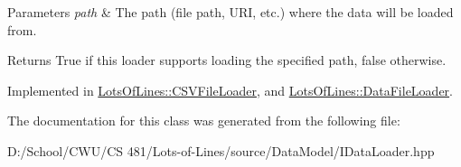 \begin{DoxyParams}{Parameters}
{\em path} & The path (file path, U\+RI, etc.) where the data will be loaded from. \\
\hline
\end{DoxyParams}
\begin{DoxyReturn}{Returns}
True if this loader supports loading the specified path, false otherwise. 
\end{DoxyReturn}


Implemented in \hyperlink{class_lots_of_lines_1_1_c_s_v_file_loader_a745f53165fdb04a372e2311c8428cc3e}{Lots\+Of\+Lines\+::\+C\+S\+V\+File\+Loader}, and \hyperlink{class_lots_of_lines_1_1_data_file_loader_ac515d96c661865355080a999b8de1967}{Lots\+Of\+Lines\+::\+Data\+File\+Loader}.



The documentation for this class was generated from the following file\+:\begin{DoxyCompactItemize}
\item 
D\+:/\+School/\+C\+W\+U/\+C\+S 481/\+Lots-\/of-\/\+Lines/source/\+Data\+Model/I\+Data\+Loader.\+hpp\end{DoxyCompactItemize}
